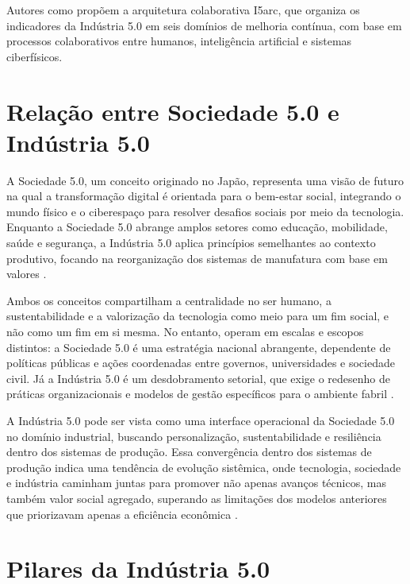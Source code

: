Autores como  propõem a arquitetura colaborativa I5arc, que organiza os indicadores da Indústria 5.0 em seis domínios de melhoria contínua, com base em processos colaborativos entre humanos, inteligência artificial e sistemas ciberfísicos.


\section{Relação entre Sociedade 5.0 e Indústria 5.0}

A Sociedade 5.0, um conceito originado no Japão, representa uma visão de futuro na qual a transformação digital é orientada para o bem-estar social, integrando o mundo físico e o ciberespaço para resolver desafios sociais por meio da tecnologia.
Enquanto a Sociedade 5.0 abrange amplos setores como educação, mobilidade, saúde e segurança, a Indústria 5.0 aplica princípios semelhantes ao contexto produtivo, focando na reorganização dos sistemas de manufatura com base em valores \cite{Santos2025,Xu2021}.

Ambos os conceitos compartilham a centralidade no ser humano, a sustentabilidade e a valorização da tecnologia como meio para um fim social, e não como um fim em si mesma.
No entanto, operam em escalas e escopos distintos: a Sociedade 5.0 é uma estratégia nacional abrangente, dependente de políticas públicas e ações coordenadas entre governos, universidades e sociedade civil.
Já a Indústria 5.0 é um desdobramento setorial, que exige o redesenho de práticas organizacionais e modelos de gestão específicos para o ambiente fabril \cite{PIZON2023, TOTH2023}.

A Indústria 5.0 pode ser vista como uma interface operacional da Sociedade 5.0 no domínio industrial, buscando personalização, sustentabilidade e resiliência dentro dos sistemas de produção.
Essa convergência dentro dos sistemas de produção indica uma tendência de evolução sistêmica, onde tecnologia, sociedade e indústria caminham juntas para promover não apenas avanços técnicos, mas também valor social agregado, superando as limitações dos modelos anteriores que priorizavam apenas a eficiência econômica \cite{VALETTE2023}.

\section{Pilares da Indústria 5.0}


